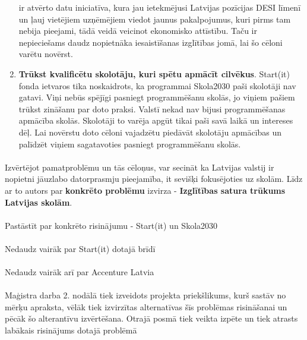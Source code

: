 \begin{enumerate}
ir atvērto datu iniciatīva, kura jau ietekmējusi Latvijas pozīcijas DESI līmenī un ļauj vietējiem uzņēmējiem
viedot jaunus pakalpojumus, kuri pirms tam nebija pieejami, tādā veidā veicinot ekonomisko attīstību. Taču ir
nepieciešams daudz nopietnāka iesaistīšanas izglītības jomā, lai šo cēloni varētu novērst.
    \item \textbf{Trūkst kvalificētu skolotāju, kuri spētu apmācīt cilvēkus}.
Start(it) fonda ietvaros tika noskaidrots, ka programmai Skola2030 paši skolotāji nav gatavi. Viņi nebūs spējīgi
pasniegt programmēšanu skolās, jo viņiem pašiem trūkst zināšanu par doto praksi. Valstī nekad nav bijusi 
programmēšanas apmācība skolās. Skolotāji to varēja apgūt tikai paši savā laikā un intereses dēļ. Lai novērstu
doto cēloni vajadzētu piedāvāt skolotāju apmācības un palīdzēt viņiem sagatavoties pasniegt programmēšanu skolās.
\end{enumerate}
\paragraph{}
Izvērtējot pamatproblēmu un tās cēloņus, var secināt ka Latvijas valstij ir nopietni jāuzlabo datorprasmju 
pieejamība, it sevišķi fokusējoties uz skolām. Līdz ar to autors par \textbf{konkrēto problēmu} izvirza -
\textbf{Izglītības satura trūkums Latvijas skolām}.
\paragraph{}
Pastāstīt par konkrēto risinājumu - Start(it) un Skola2030
\paragraph{}
Nedaudz vairāk par Start(it) dotajā brīdī
\paragraph{}
Nedaudz vairāk arī par Accenture Latvia
\paragraph{}
Maģistra darba 2. nodālā tiek izveidots projekta priekšlikums, kurš sastāv no mērķu apraksta,
vēlāk tiek izvirzītas alternatīvas šīs problēmas risināšanai un pēcāk šo alterantīvu izvērtēšana.
Otrajā posmā tiek veikta izpēte un tiek atrasts labākais risinājums dotajā problēmā